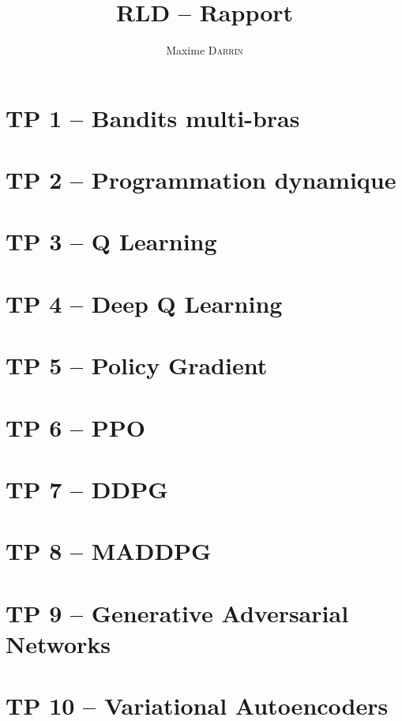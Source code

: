 \documentclass[french, titlepage]{article}
\title{RLD -- Rapport}
\author{Maxime \textsc{Darrin}}
\begin{document}
	\maketitle

	\tableofcontents
	\newpage
	
	\section{TP 1 -- Bandits multi-bras} 
	

	\section{TP 2 -- Programmation dynamique}

	

	\section{TP 3 -- Q Learning}

	

	\section{TP 4 -- Deep Q Learning}

	

	\section{TP 5 -- Policy Gradient}

	

	\section{TP 6 -- PPO}
	
	

	\section{TP 7 -- DDPG}
	
	

	\section{TP 8 -- MADDPG}

	

	\section{TP 9 -- Generative Adversarial Networks}

	

	\section{TP 10 -- Variational Autoencoders}

	





	
\end{document}
